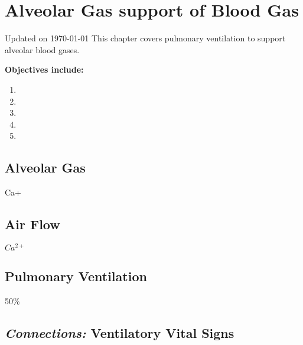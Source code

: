 \chapter{Alveolar Gas support of Blood Gas}\label{chp:alveolar_oxygen}
Updated on \today
\minitoc
This chapter covers pulmonary ventilation to support alveolar blood gases.

\vspace{5mm}

\textbf{Objectives include:}
\begin{enumerate}
    \item
    \item
    \item
    \item
    \item
\end{enumerate}

\section{Alveolar Gas}
Ca+
\section{Air Flow}
$Ca^{2+}$
\section{Pulmonary Ventilation}
50\%
\section{\textit{Connections:} Ventilatory Vital Signs}

\printbibliography[heading=subbibintoc]